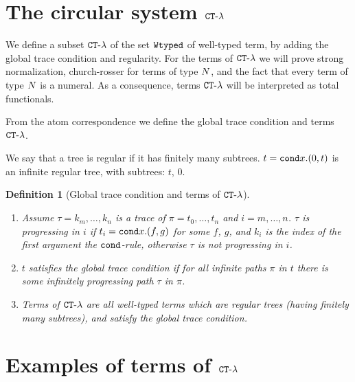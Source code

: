 \documentclass{article}
\newtheorem{definition}[theorem]{Definition}
\begin{document}
\section{The circular system ${ {\tt CT} \mbox{-} \lambda}$}
We define a subset ${ {\tt CT} \mbox{-} \lambda}$ of the set ${\tt Wtyped}$ of well-typed term,
by adding the global trace condition and regularity. 
For the terms of ${ {\tt CT} \mbox{-} \lambda}$ we will prove
strong normalization, church-rosser for terms of type ${N}$, and the fact that every term of type
${N}$ is a numeral. 
As a consequence, terms ${ {\tt CT} \mbox{-} \lambda}$ will be interpreted as total functionals. 

From the atom correspondence we define the global trace condition and terms ${ {\tt CT} \mbox{-} \lambda}$.

We say that a tree is regular if it has finitely many subtrees. $t={\tt cond} x.(0,t)$ is an infinite regular tree,
with subtrees: $t$, $0$.

\begin{definition}[Global trace condition and terms of ${ {\tt CT} \mbox{-} \lambda}$]
\begin{enumerate}
\item
Assume $\tau = k_m, \ldots, k_n$ is a trace of $\pi =t_0, \ldots, t_n$ and $i=m,\ldots, n$.
$\tau$ is progressing in $i$ if $t_i={\tt cond} x.(f,g)$ for some $f$, $g$,
and $k_i$ is the index of the first argument the ${\tt cond}$-rule, otherwise $\tau$ is not progressing in $i$.

\item
$t$ satisfies the global trace condition if for all infinite paths $\pi$ in $t$ 
there is some infinitely progressing path $\tau$ in $\pi$.

\item
Terms of ${ {\tt CT} \mbox{-} \lambda}$ are all well-typed terms which are regular trees (having finitely many subtrees), 
and satisfy the global trace condition.

\end{enumerate}
\end{definition}


\section{Examples of terms of ${ {\tt CT} \mbox{-} \lambda}$}
\end{document}

